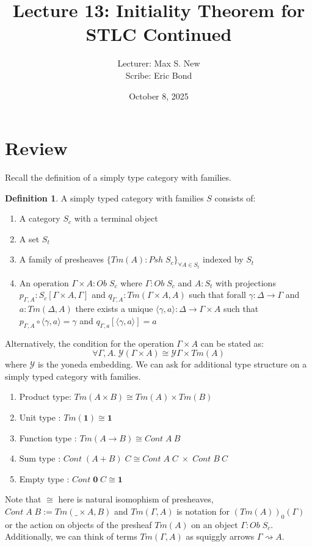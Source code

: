\documentclass[12pt]{article}
\theoremstyle{definition}
\newtheorem{definition}{Definition}[section]
\newcommand{\yo}{\mathcal Y}
\begin{document}
\title{Lecture 13: Initiality Theorem for STLC Continued}
\author{Lecturer:  Max S. New\\ Scribe: Eric Bond}
\date{October 8, 2025}
\maketitle

\section{Review}
Recall the definition of a simply type category with families.
\begin{definition}
    A simply typed category with families $S$ consists of:
    \begin{enumerate}
        \item A category $S_c$ with a terminal object
        \item A set $S_t$ 
        \item A family of presheaves $\{Tm(A) : Psh\;S_c\}_{\forall A \in S_t}$ indexed by $S_t$
        \item An operation $\Gamma \times A : Ob\; S_c$ where $\Gamma : Ob\; S_c$ and $A : S_t$ with projections $p_{\Gamma,A} : S_c[\Gamma \times A , \Gamma]$ and $q_{\Gamma,A} : Tm(\Gamma \times A,A)$ such that forall $\gamma : \Delta \to \Gamma$ and $a : Tm(\Delta,A)$ there exists a unique $\langle\gamma,a\rangle:\Delta \to \Gamma \times A$ such that $p_{\Gamma,A} \circ \langle \gamma,a \rangle = \gamma$ and $q_{\Gamma,a}[\langle \gamma,a\rangle]= a$
    \end{enumerate}
\end{definition}

Alternatively, the condition for the operation $\Gamma \times A$ can be stated as: 
\[
\forall \Gamma,A.\; \yo(\Gamma \times A) \cong \yo \Gamma \times Tm(A)
\]
where $\yo$ is the yoneda embedding. We can ask for additional type structure on a simply typed category with families.

\begin{enumerate}
    \item Product type: $Tm(A \times B) \cong Tm(A) \times Tm(B)$
    \item Unit type : $Tm(\mathbf{1}) \cong \mathbf{1}$
    \item Function type : $Tm(A \to B) \cong Cont \;A \:B$
    \item Sum type : $Cont\;(A + B )\;C\cong Cont\; A \; C \;\times \; Cont\;B\:C$
    \item Empty type : $Cont \;\mathbf{0}\;C \cong \mathbf{1}$
\end{enumerate}
Note that $\cong$ here is natural isomophism of presheaves, $Cont \;A \;B := Tm(\_ \times A, B)$ and $Tm(\Gamma,A)$ is notation for $(Tm(A))_0(\Gamma)$ or the action on objects of the presheaf $Tm(A)$ on an object $\Gamma : Ob \;S_c$. Additionally, we can think of terms $Tm(\Gamma,A)$ as squiggly arrows $\Gamma \rightsquigarrow A$.
\end{document}
